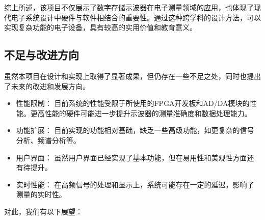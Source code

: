 \documentclass[lang=cn,a4paper,newtx]{elegantpaper}
\begin{document}
	综上所述，该项目不仅展示了数字存储示波器在电子测量领域的应用，也体现了现代电子系统设计中硬件与软件相结合的重要性。通过这种跨学科的设计方法，可以实现复杂功能的电子设备，具有较高的实用价值和教育意义。

%


\subsection{不足与改进方向}



虽然本项目在设计和实现上取得了显著成果，但仍存在一些不足之处，同时也提出了未来的改进和发展方向。
\begin{itemize}
	\item 性能限制： 目前系统的性能受限于所使用的FPGA开发板和AD/DA模块的性能。更高性能的硬件可能进一步提升示波器的测量准确度和数据处理能力。
	\item 功能扩展： 目前实现的功能相对基础，缺乏一些高级功能，如更复杂的信号分析、频谱分析等。
	\item 用户界面： 虽然用户界面已经实现了基本功能，但在易用性和美观性方面还有待提升。
	\item 实时性能： 在高频信号的处理和显示上，系统可能存在一定的延迟，影响了测量的实时性。
\end{itemize}
对此，我们有以下展望：
\end{document}
